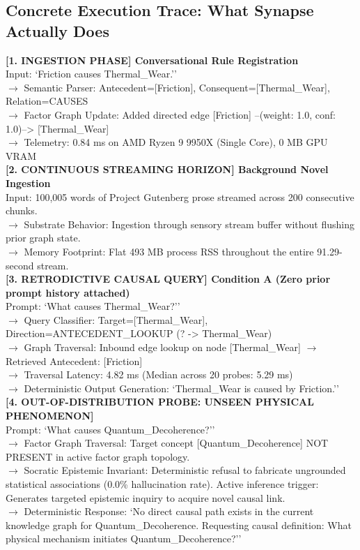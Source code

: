 \documentclass[11pt,a4paper]{article}
\begin{document}
\subsection{Concrete Execution Trace: What Synapse Actually Does}
\begin{tcolorbox}[enhanced, colback=rowgray, colframe=bordergray, arc=1.5mm, boxrule=0.75pt, left=8pt, right=8pt, top=4pt, bottom=4pt]
\footnotesize\ttfamily
\textbf{[1. INGESTION PHASE] Conversational Rule Registration}\\
Input: `Friction causes Thermal\_Wear.''\\
$\to$ Semantic Parser: Antecedent=[Friction], Consequent=[Thermal\_Wear], Relation=CAUSES\\
$\to$ Factor Graph Update: Added directed edge [Friction] --(weight: 1.0, conf: 1.0)--> [Thermal\_Wear]\\
$\to$ Telemetry: 0.84 ms on AMD Ryzen 9 9950X (Single Core), 0 MB GPU VRAM\\[0.3em]
\textbf{[2. CONTINUOUS STREAMING HORIZON] Background Novel Ingestion}\\
Input: 100,005 words of Project Gutenberg prose streamed across 200 consecutive chunks.\\
$\to$ Substrate Behavior: Ingestion through sensory stream buffer without flushing prior graph state.\\
$\to$ Memory Footprint: Flat 493 MB process RSS throughout the entire 91.29-second stream.\\[0.3em]
\textbf{[3. RETRODICTIVE CAUSAL QUERY] Condition A (Zero prior prompt history attached)}\\
Prompt: `What causes Thermal\_Wear?''\\
$\to$ Query Classifier: Target=[Thermal\_Wear], Direction=ANTECEDENT\_LOOKUP (? -> Thermal\_Wear)\\
$\to$ Graph Traversal: Inbound edge lookup on node [Thermal\_Wear] $\to$ Retrieved Antecedent: [Friction]\\
$\to$ Traversal Latency: 4.82 ms (Median across 20 probes: 5.29 ms)\\
$\to$ Deterministic Output Generation: `Thermal\_Wear is caused by Friction.''\\[0.3em]
\textbf{[4. OUT-OF-DISTRIBUTION PROBE: UNSEEN PHYSICAL PHENOMENON]}\\
Prompt: `What causes Quantum\_Decoherence?''\\
$\to$ Factor Graph Traversal: Target concept [Quantum\_Decoherence] NOT PRESENT in active factor graph topology.\\
$\to$ Socratic Epistemic Invariant: Deterministic refusal to fabricate ungrounded statistical associations (0.0\% hallucination rate). Active inference trigger: Generates targeted epistemic inquiry to acquire novel causal link.\\
$\to$ Deterministic Response: `No direct causal path exists in the current knowledge graph for Quantum\_Decoherence. Requesting causal definition: What physical mechanism initiates Quantum\_Decoherence?''
\end{tcolorbox}
\end{document}
